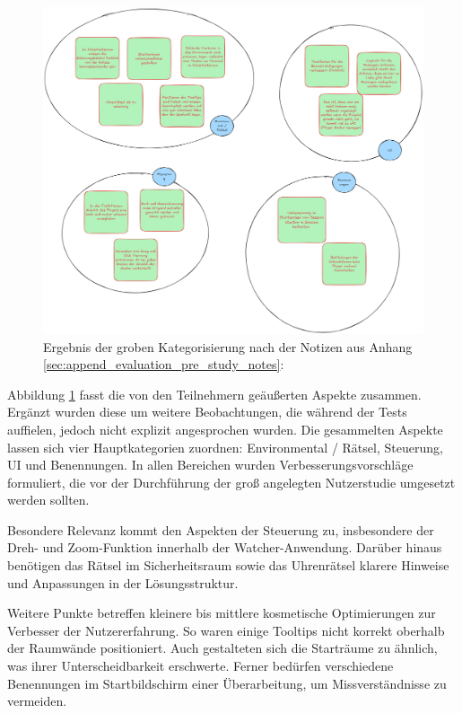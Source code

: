 \begin{figure}[ht]
\centering
\includegraphics[width=1\linewidth]{content/pictures/Prestudy-Qualitative-Auswertung-Schritt-1.png}
\caption{Ergebnis der groben Kategorisierung nach \citealp{braun_using_2006} der Notizen aus Anhang \ref{sec:append_evaluation_pre_study_notes}: }
\label{fig:pre-study-qualitative-findings}
\end{figure}

Abbildung \ref{fig:pre-study-qualitative-findings} fasst die von den Teilnehmern geäußerten Aspekte zusammen. Ergänzt wurden diese um weitere Beobachtungen, die während der Tests auffielen, jedoch nicht explizit angesprochen wurden. Die gesammelten Aspekte lassen sich vier Hauptkategorien zuordnen: Environmental / Rätsel, Steuerung, UI und Benennungen. In allen Bereichen wurden Verbesserungsvorschläge formuliert, die vor der Durchführung der groß angelegten Nutzerstudie umgesetzt werden sollten.

Besondere Relevanz kommt den Aspekten der Steuerung zu, insbesondere der Dreh- und Zoom-Funktion innerhalb der Watcher-Anwendung. Darüber hinaus benötigen das Rätsel im Sicherheitsraum sowie das Uhrenrätsel klarere Hinweise und Anpassungen in der Lösungsstruktur.

Weitere Punkte betreffen kleinere bis mittlere kosmetische Optimierungen zur Verbesser der Nutzererfahrung. So waren einige Tooltips nicht korrekt oberhalb der Raumwände positioniert. Auch gestalteten sich die Starträume zu ähnlich, was ihrer Unterscheidbarkeit erschwerte. Ferner bedürfen verschiedene Benennungen im Startbildschirm einer Überarbeitung, um Missverständnisse zu vermeiden.

